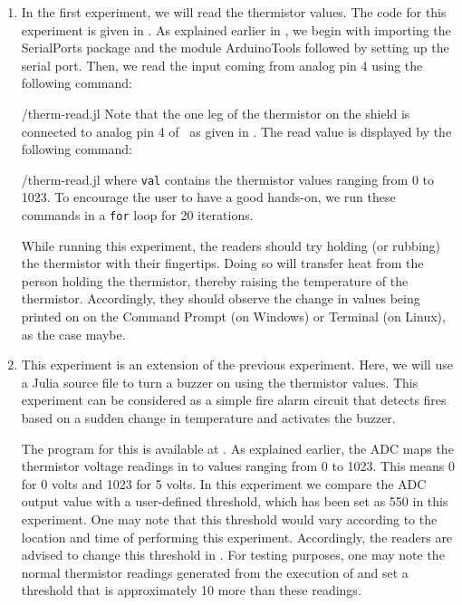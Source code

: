 \begin{enumerate}
  \item In the first experiment, we will read the thermistor values.
        The code for this experiment is given in
        . As explained earlier in , we begin with importing the SerialPorts
        \cite{julia-serial-ports} package and the module ArduinoTools followed by setting up the serial port.
        Then, we read the input coming from analog pin 4 using the
        following command:
        
        {\LocTHERMjuliacode/therm-read.jl} Note that the one leg of the thermistor on
        the shield is connected to analog pin 4 of \arduino\,
        as given in . The read value is displayed
        by the following command:
        
        {\LocTHERMjuliacode/therm-read.jl} where {\tt val} contains
        the thermistor values ranging from 0 to 1023. To
        encourage the user to have a good hands-on, we run these commands in
        a {\tt for} loop for 20 iterations.

        While running this experiment,
        the readers should try holding (or rubbing) the thermistor with their fingertips.
        Doing so will transfer heat from the person holding the
        thermistor, thereby raising the temperature of the thermistor.
        Accordingly, they should observe the change in values being printed on on the
        Command Prompt (on Windows) or Terminal (on Linux), as the case maybe.

  \item This experiment is an extension of the previous
        experiment. Here, we will use a Julia source file to
        turn a buzzer on using the thermistor values. This experiment
        can be considered as a simple fire alarm circuit that
        detects fires based on a sudden change in temperature and
        activates the buzzer.

        The program for this is available at
        .  As explained earlier,
        the ADC maps the thermistor voltage readings in to values
        ranging from 0 to 1023. This means 0 for 0 volts and 1023 for 5
        volts. In this experiment we compare the ADC output value with a user-defined
        threshold, which has been set as 550 in this experiment. One may note that
        this threshold would vary according to the location and time of performing
        this experiment. Accordingly, the readers are advised to change this threshold
        in . For testing purposes, one may note the
        normal thermistor readings generated from the execution of 
        and set a threshold that is approximately 10 more than these readings.



\end{enumerate}
